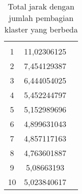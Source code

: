 \begin{table}[H]
\small
\centering
\begin{tabular}{ccl}
\cellcolor[HTML]{4472C4}{\color[HTML]{FFFFFF} \textbf{Banyak Klaster}} & \cellcolor[HTML]{4472C4}{\color[HTML]{FFFFFF} \textbf{Total Jarak}} &  \\
\cellcolor[HTML]{D9E1F2}1 & \cellcolor[HTML]{D9E1F2}11,02306125 &  \\
2                         & 7,454129387                         &  \\
\cellcolor[HTML]{D9E1F2}3 & \cellcolor[HTML]{D9E1F2}6,444054025 &  \\
4                         & 5,452244797                         &  \\
\cellcolor[HTML]{D9E1F2}5 & \cellcolor[HTML]{D9E1F2}5,152989696 &  \\
6                         & 4,899631043                         &  \\
\cellcolor[HTML]{D9E1F2}7 & \cellcolor[HTML]{D9E1F2}4,857117163 &  \\
8                         & 4,763601887                         &  \\
\cellcolor[HTML]{D9E1F2}9 & \cellcolor[HTML]{D9E1F2}5,08663193  &  \\
10                        & 5,023840617                         & 
\end{tabular}
\caption{Total jarak dengan jumlah pembagian klaster yang berbeda}
\label{tab:totaljarak}
\end{table}